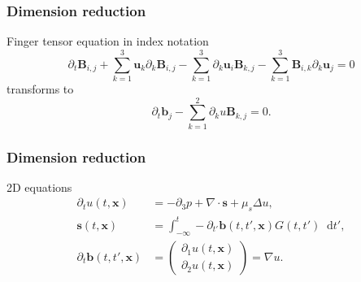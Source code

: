 \documentclass[12pt,a4paper]{beamer}
\theoremstyle{definition}
\theoremstyle{plain}
\newcommand{\bfb}{\bm{b}}
\newcommand{\bfs}{\bm{s}}
\newcommand{\bfx}{\bm{x}}
\newcommand{\D}{\mathop{}\!\mathrm{d}}
\begin{document}
\begin{frame}
    \frametitle{Dimension reduction}
    Finger tensor equation in index notation
    \begin{equation*}
    \partial_t \bm{B}_{i,j}+\sum_{k=1}^3\bm{u}_k\partial_k \bm{B}_{i,j}-\sum_{k=1}^3\partial_k\bm{u}_i\bm{B}_{k,j}-\sum_{k=1}^3\bm{B}_{i,k}\partial_k\bm{u}_j=0
    \end{equation*}
    transforms to
    \begin{equation*}
    \partial_t \bfb_j -\sum_{k=1}^2\partial_ku\bm{B}_{k,j}=0.
    \end{equation*}
\end{frame}
\begin{frame}
    \frametitle{Dimension reduction}
    2D equations 
    \begin{align*}
    \partial_t u(t,\bfx) &= -\partial_3 p +\nabla\cdot \bfs+\mu_s\Delta u,\\
    \bfs(t,\bfx) &=\int_{-\infty}^t-\partial_{t'}\bfb(t,t',\bfx)G(t,t')\D t',\label{eq:s2D}\\
    \partial_t\bfb(t,t',\bfx)&=
    \begin{pmatrix}
    \partial_1 u(t,\bfx)\\\partial_2 u(t,\bfx)
    \end{pmatrix}=\nabla u.
    \end{align*}
\end{frame}
\end{document}
